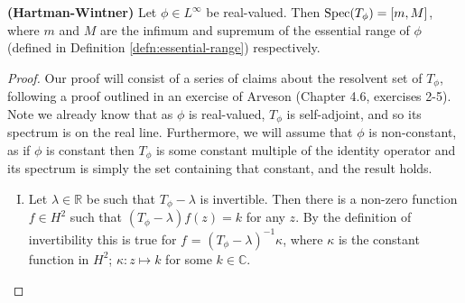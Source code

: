 \documentclass[../main.tex]{subfiles}
\begin{document}
\begin{theorem}{\textbf{(Hartman-Wintner)}}
Let $\phi \in L^\infty$ be real-valued. Then $\mathrm{Spec}(T_\phi) = [m, M]$, where $m$ and $M$ are the infimum and supremum of the essential range of $\phi$ (defined in Definition \ref{defn:essential-range}) respectively.
\end{theorem}
\begin{proof}
Our proof will consist of a series of claims about the resolvent set of $T_\phi$, following a proof outlined in an exercise of Arveson \parencite{arveson2002short} (Chapter 4.6, exercises 2-5). 
Note we already know that as $\phi$ is real-valued, $T_\phi$ is self-adjoint, and so its spectrum is on the real line. 
Furthermore, we will assume that $\phi$ is non-constant, as if $\phi$ is constant then $T_\phi$ is some constant multiple of the identity operator
and its spectrum is simply the set containing that constant, and the result holds.
\begin{enumerate}[I.]
\item Let $\lambda \in \mathbb{R}$ be such that $T_\phi - \lambda$ is invertible. Then there is a non-zero function $f \in H^2$ such that $(T_\phi - \lambda)f(z) = k$ for any $z$. By the definition of invertibility this is true for $f$ = $(T_\phi - \lambda)^{-1}\kappa$, where
$\kappa$ is the constant function in $H^2$; $\kappa : z \mapsto k$ for some $k \in \mathbb{C}.$


\end{enumerate}
\end{proof}
\end{document}
